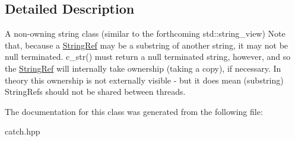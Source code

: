 \subsection{Detailed Description}
A non-\/owning string class (similar to the forthcoming std\+::string\+\_\+view) Note that, because a \mbox{\hyperlink{classCatch_1_1StringRef}{String\+Ref}} may be a substring of another string, it may not be null terminated. c\+\_\+str() must return a null terminated string, however, and so the \mbox{\hyperlink{classCatch_1_1StringRef}{String\+Ref}} will internally take ownership (taking a copy), if necessary. In theory this ownership is not externally visible -\/ but it does mean (substring) String\+Refs should not be shared between threads. 

The documentation for this class was generated from the following file\+:\begin{DoxyCompactItemize}
\item 
catch.\+hpp\end{DoxyCompactItemize}
